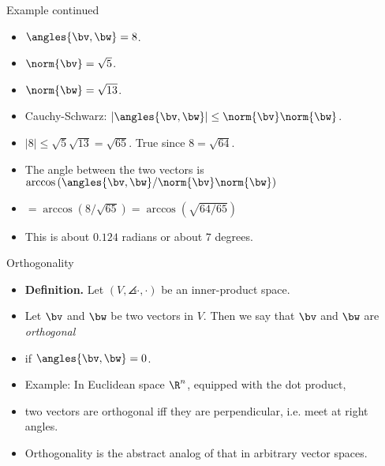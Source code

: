 \documentclass{beamer}
\begin{document}
\begin{frame}{Example continued}

\begin{itemize}
\item $\angles{\bv,\bw} =  8$.
\item $\norm{\bv} = \sqrt{5}$.
\item $\norm{\bw} =  \sqrt{13}$.
\item Cauchy-Schwarz: $|\angles{\bv,\bw}| \leq \norm{\bv} \norm{\bw}$.
\item $|8| \leq \sqrt{5}\sqrt{13} = \sqrt{65}$. True since $8=\sqrt{64}$.
\item The angle between the two vectors is $\arccos\left(\angles{\bv,\bw}/\norm{\bv}\norm{\bw}\right)$
\item $=\arccos(8/\sqrt{65}) = \arccos(\sqrt{64/65})$
\item This is about $0.124$ radians or about $7$ degrees.
\end{itemize}
\end{frame}

\begin{frame}{Orthogonality}

\begin{itemize}
\item \textbf{Definition.} Let $\left(V, \angles{\cdot,\cdot}\right)$ be an inner-product space.
\item Let $\bv$ and $\bw$ be two vectors in $V$. Then we say that $\bv$ and $\bw$ are \emph{orthogonal}
\item if $\angles{\bv,\bw}=0$.
\item Example: In Euclidean space $\R^n$, equipped with the dot product,
\item two vectors are orthogonal iff they are perpendicular, i.e. meet at right angles.
\item Orthogonality is the abstract analog of that in arbitrary vector spaces.
\end{itemize}
\end{frame}
\end{document}
